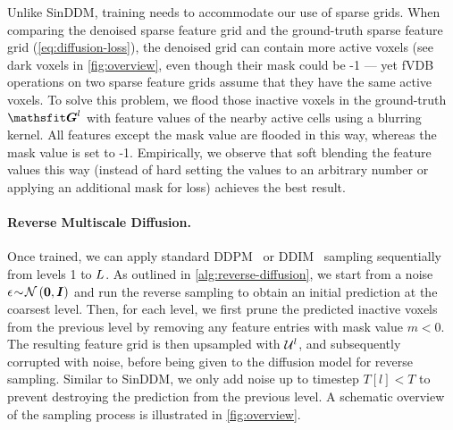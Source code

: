 \noindent Unlike SinDDM, training needs to accommodate our use of sparse grids.
When comparing the denoised sparse feature grid and the ground-truth sparse feature grid (\cref{eq:diffusion-loss}), the denoised grid can contain more active voxels (see dark voxels in \cref{fig:overview}, even though their mask could be -1 --- yet
fVDB operations on two sparse feature grids assume that they have the same active voxels. 
To solve this problem, we flood those inactive voxels in the ground-truth \(\grid^{\lvl}\) with feature values of the nearby active cells using a blurring kernel. All features except the mask value are flooded in this way, whereas the mask value is set to -1. Empirically, we observe that soft blending the feature values this way (instead of hard setting the values to an arbitrary number or applying an additional mask for loss) achieves the best result. 

\paragraph{Reverse Multiscale Diffusion.}
Once trained, we can apply standard DDPM~\cite{ho2020denoising} or DDIM~\cite{song2021denoising} sampling sequentially from levels 1 to \(L\).
As outlined in \cref{alg:reverse-diffusion}, we start from a noise \({\mathbf{\epsilon}}\!\sim\! \mathcal{N}\left({\bm{0}}, {\bm{I}}\right)\)  and run the reverse sampling to obtain an initial prediction at the coarsest level.
Then, for each level, we first prune the predicted inactive voxels from the previous level by removing any feature entries with mask value $m \!<\! 0$.
The resulting feature grid is then upsampled with \(\mathcal{U}^{l}\), and subsequently corrupted with noise, before being given to the diffusion model for reverse sampling.
Similar to SinDDM, we only add noise up to timestep $T[l] \!<\! T$ to prevent destroying the prediction from the previous level. 
A schematic overview of the sampling process is illustrated in \cref{fig:overview}. 

